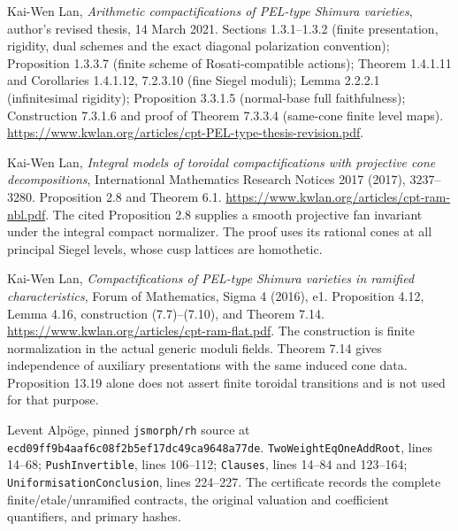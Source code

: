 Kai-Wen Lan, \emph{Arithmetic compactifications of PEL-type Shimura
varieties}, author's revised thesis, 14 March 2021.
Sections 1.3.1--1.3.2 (finite presentation, rigidity, dual schemes
and the exact diagonal polarization convention);
Proposition 1.3.3.7 (finite scheme of Rosati-compatible actions);
Theorem 1.4.1.11 and Corollaries 1.4.1.12, 7.2.3.10 (fine Siegel moduli);
Lemma 2.2.2.1 (infinitesimal rigidity);
Proposition 3.3.1.5 (normal-base full faithfulness);
Construction 7.3.1.6 and proof of Theorem 7.3.3.4 (same-cone finite level maps).
\url{https://www.kwlan.org/articles/cpt-PEL-type-thesis-revision.pdf}.

Kai-Wen Lan, \emph{Integral models of toroidal compactifications with
projective cone decompositions}, International Mathematics Research
Notices 2017 (2017), 3237--3280. Proposition 2.8 and Theorem 6.1.
\url{https://www.kwlan.org/articles/cpt-ram-nbl.pdf}.
The cited Proposition 2.8 supplies a smooth projective fan invariant
under the integral compact normalizer.  The proof uses its rational
cones at all principal Siegel levels, whose cusp lattices are homothetic.

Kai-Wen Lan, \emph{Compactifications of PEL-type Shimura varieties
in ramified characteristics}, Forum of Mathematics, Sigma 4 (2016),
e1.  Proposition 4.12, Lemma 4.16, construction (7.7)--(7.10), and
Theorem 7.14.
\url{https://www.kwlan.org/articles/cpt-ram-flat.pdf}.
The construction is finite normalization in the actual generic moduli
fields.  Theorem 7.14 gives independence of auxiliary presentations
with the same induced cone data.  Proposition 13.19 alone does not
assert finite toroidal transitions and is not used for that purpose.

Levent Alp\"oge, pinned \texttt{jsmorph/rh} source at
\texttt{ecd09ff9b4aaf6c08f2b5ef17dc49ca9648a77de}.
\texttt{TwoWeightEqOneAddRoot}, lines 14--68;
\texttt{PushInvertible}, lines 106--112;
\texttt{Clauses}, lines 14--84 and 123--164;
\texttt{UniformisationConclusion}, lines 224--227.
The certificate records the complete finite/etale/unramified contracts,
the original valuation and coefficient quantifiers, and primary hashes.
